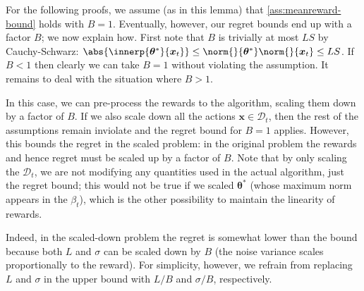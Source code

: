 \documentclass{article}
\renewcommand{\vec}[1]{\bm{#1}}
\DeclarePairedDelimiter{\abs}||
\newcommand{\D}{\mathcal{D}}
\begin{document}
\begin{remark}%
  \label{remark:meanreward-bound}
  For the following proofs, we assume (as in this lemma) that
  \cref{ass:meanreward-bound} holds with $B=1$.  Eventually, however,
  our regret bounds end up with a factor $B$; we now explain how.
  First note that $B$ is trivially at most $LS$ by Cauchy-Schwarz:
  $\abs{\innerp{\vec\theta^*}{\vec x_t}} \le
  \norm{}{\vec\theta^*}\norm{}{\vec x_t} \le LS$.  If $B<1$ then
  clearly we can take $B=1$ without violating the assumption.  It
  remains to deal with the situation where $B>1$.

  In this case, we can pre-process the rewards to the algorithm,
  scaling them down by a factor of $B$.  If we also scale down all the
  actions $\vec x\in\D_t$, then the rest of the assumptions remain
  inviolate and the regret bound for $B=1$ applies.  However, this
  bounds the regret in the scaled problem: in the original problem the
  rewards and hence regret must be scaled up by a factor of $B$.  Note
  that by only scaling the $\D_t$, we are not modifying any
  quantities used in the actual algorithm, just the regret bound; this
  would not be true if we scaled $\vec\theta^*$ (whose maximum norm
  appears in the $\beta_t$), which is the other
  possibility to maintain the linearity of rewards.

  Indeed, in the scaled-down problem the regret is somewhat lower than
  the bound because both $L$ and $\sigma$ can be scaled down by $B$
  (the noise variance scales proportionally to the reward).  For
  simplicity, however, we refrain from replacing $L$ and $\sigma$ in
  the upper bound with $L/B$ and $\sigma/B$, respectively.
\end{remark}
\end{document}
